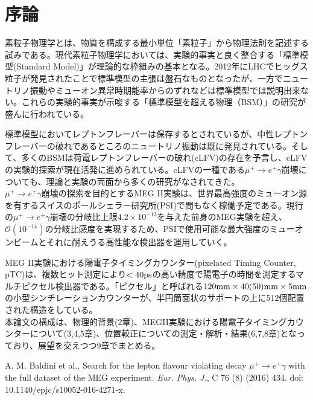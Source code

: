 \documentclass[Yonemoto_master.tex]{subfiles}
\begin{document}
\chapter{序論}

素粒子物理学とは、物質を構成する最小単位「素粒子」から物理法則を記述する試みである。現代素粒子物理学においては、実験的事実と良く整合する「標準模型(Standard Model)」が理論的な枠組みの基本となる。2012年にLHCでヒッグス粒子が発見されたことで標準模型の主張は盤石なものとなったが、一方でニュートリノ振動やミューオン異常時期能率からのずれなどは標準模型では説明出来ない。これらの実験的事実が示唆する「標準模型を超える物理（BSM）」の研究が盛んに行われている。

標準模型においてレプトンフレーバーは保存するとされているが、中性レプトンフレーバーの破れであるところのニュートリノ振動は既に発見されている。そして、多くのBSMは荷電レプトンフレーバーの破れ(cLFV)の存在を予言し、cLFVの実験的探索が現在活発に進められている。cLFVの一種である$\mu^+ \to e^+\gamma$崩壊についても、理論と実験の両面から多くの研究がなされてきた。\\


$\mu^+ \to e^+\gamma$崩壊の探索を目的とするMEG II実験は、世界最高強度のミューオン源を有するスイスのポールシェラー研究所(PSI)で間もなく稼働予定である。現行の$\mu^+ \to e^+\gamma$崩壊の分岐比上限$4.2 \times 10^{-13}$を与えた前身のMEG実験\cite{MEG}を超え、$\mathcal{O}(10^{-14})$の分岐比感度を実現するため、PSIで使用可能な最大強度のミューオンビームとそれに耐えうる高性能な検出器を運用していく。


MEG II実験における陽電子タイミングカウンター(pixelated Timing Counter, pTC)は、複数ヒット測定により$< 40 \rm ps$の高い精度で陽電子の時間を測定するマルチピクセル検出器である。「ピクセル」と呼ばれる$120 {\rm mm} \times 40 (50){\rm mm} \times 5 {\rm mm}$の小型シンチレーションカウンターが、半円筒面状のサポートの上に512個配置された構造をしている。\\


本論文の構成は、物理的背景(2章)、MEGII実験における陽電子タイミングカウンターについて(3,4,5章)、位置較正についての測定・解析・結果(6,7,8章)となっており、展望を交えつつ9章でまとめる。

{ }{
\begin{thebibliography}{99}
 A. M. Baldini et al., Search for the lepton flavour violating decay $\mu^+ \to e^+ \gamma$ with the full dataset of the MEG experiment. {\it Eur. Phys. J.}, C 76 (8) (2016) 434. 
doi: 10.1140/epjc/s10052-016-4271-x. 
\end{thebibliography}
}
\end{document}
